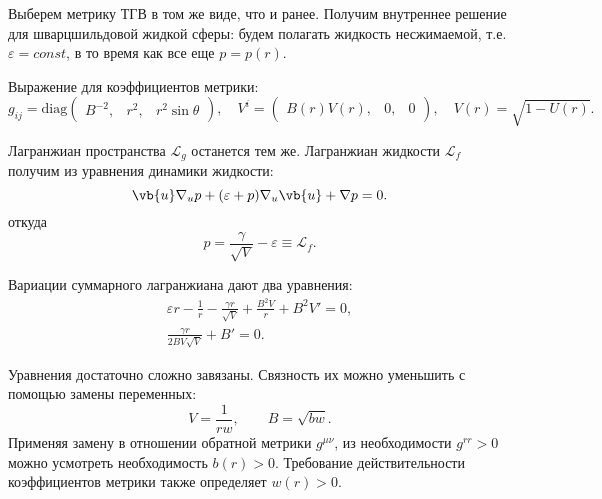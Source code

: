 \documentclass[\docroot/reports/draft/report.tex]{subfiles}
\begin{document}
    Выберем метрику ТГВ в том же виде, что и ранее. Получим внутреннее решение для шварцшильдовой жидкой сферы: будем полагать жидкость несжимаемой, т.е. $\varepsilon = const$, в то время как все еще $p = p(r)$.

    Выражение для коэффициентов метрики:
    \begin{equation*}
        g_{ij} = \text{diag} \begin{pmatrix}B^{-2}, & r^2, & r^2 \sin\theta\end{pmatrix} , \quad
        V^i = \begin{pmatrix}B(r)V(r), & 0, & 0\end{pmatrix} , \quad
        V(r) = \sqrt{1 - U(r)} .
    \end{equation*}

    Лагранжиан пространства $\mathcal{L}_g$ останется тем же. Лагранжиан жидкости $\mathcal{L}_f$ получим из уравнения динамики жидкости:
    \begin{equation*}
        \vb{u} \nabla_u p + (\varepsilon + p) \nabla_u \vb{u} + \nabla p = 0 .
    \end{equation*}
    откуда
    \begin{equation*}
        p = \frac{\gamma}{\sqrt{V}} - \varepsilon \equiv \mathcal{L}_f .
    \end{equation*}

    Вариации суммарного лагранжиана дают два уравнения:
    \begin{gather*}
        \varepsilon r - \frac{1}{r} - \frac{\gamma r}{\sqrt{V}} + \frac{B^2 V}{r} + B^2 V' = 0 , \\
        \frac{\gamma r}{2 B V \sqrt{V}} + B' = 0 .
    \end{gather*}

    Уравнения достаточно сложно завязаны. Связность их можно уменьшить с помощью замены переменных:
    \begin{equation*}
        V = \frac{1}{r w} , \qquad B = \sqrt{b w} .
    \end{equation*}
    Применяя замену в отношении обратной метрики $g^{\mu\nu}$, из необходимости $g^{rr} > 0$ можно усмотреть необходимость $b(r) > 0$. Требование действительности коэффициентов метрики также определяет $w(r) > 0$.
\end{document}
